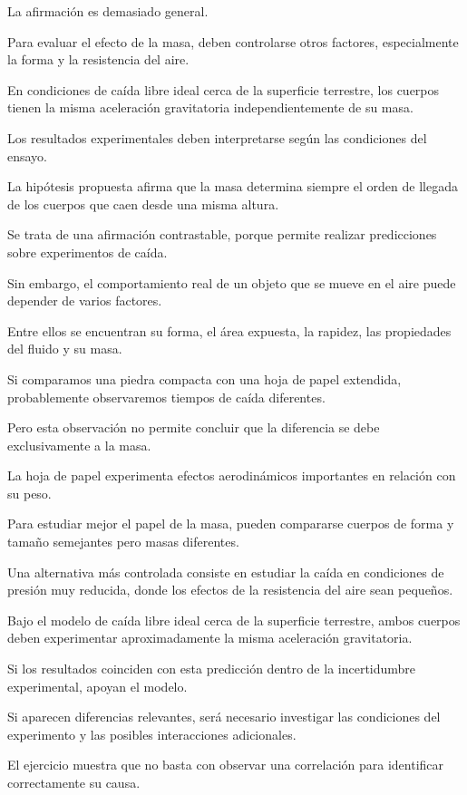 \begin{respuesta}
La afirmación es demasiado general.

Para evaluar el efecto de la masa, deben controlarse otros factores, especialmente la forma y la resistencia del aire.

En condiciones de caída libre ideal cerca de la superficie terrestre, los cuerpos tienen la misma aceleración gravitatoria independientemente de su masa.

Los resultados experimentales deben interpretarse según las condiciones del ensayo.
\end{respuesta}

\begin{explicacion}
La hipótesis propuesta afirma que la masa determina siempre el orden de llegada de los cuerpos que caen desde una misma altura.

Se trata de una afirmación contrastable, porque permite realizar predicciones sobre experimentos de caída.

Sin embargo, el comportamiento real de un objeto que se mueve en el aire puede depender de varios factores.

Entre ellos se encuentran su forma, el área expuesta, la rapidez, las propiedades del fluido y su masa.

Si comparamos una piedra compacta con una hoja de papel extendida, probablemente observaremos tiempos de caída diferentes.

Pero esta observación no permite concluir que la diferencia se debe exclusivamente a la masa.

La hoja de papel experimenta efectos aerodinámicos importantes en relación con su peso.

Para estudiar mejor el papel de la masa, pueden compararse cuerpos de forma y tamaño semejantes pero masas diferentes.

Una alternativa más controlada consiste en estudiar la caída en condiciones de presión muy reducida, donde los efectos de la resistencia del aire sean pequeños.

Bajo el modelo de caída libre ideal cerca de la superficie terrestre, ambos cuerpos deben experimentar aproximadamente la misma aceleración gravitatoria.

Si los resultados coinciden con esta predicción dentro de la incertidumbre experimental, apoyan el modelo.

Si aparecen diferencias relevantes, será necesario investigar las condiciones del experimento y las posibles interacciones adicionales.

El ejercicio muestra que no basta con observar una correlación para identificar correctamente su causa.
\end{explicacion}


